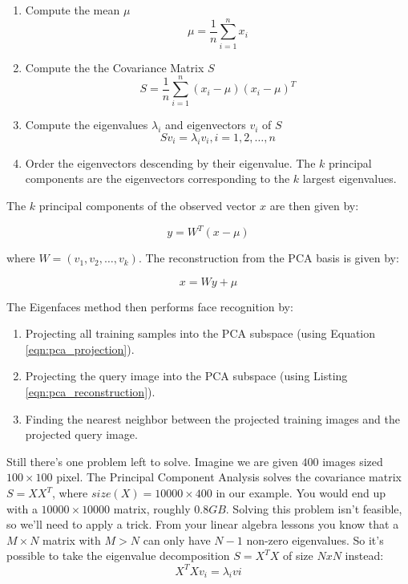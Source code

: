 \begin{enumerate}
	\item Compute the mean $\mu$
		\begin{equation} \label{eqn:pca_mean}
			\mu = \frac{1}{n} \sum_{i=1}^{n} x_{i}
		\end{equation}
	\item Compute the the Covariance Matrix $S$
		\begin{equation} \label{eqn:pca_cov}
			S = \frac{1}{n} \sum_{i=1}^{n} (x_{i} - \mu) (x_{i} - \mu)^{T}
		\end{equation}
	\item Compute the eigenvalues $\lambda_{i}$ and eigenvectors $v_{i}$ of $S$
		\begin{equation}  \label{eqn:pca_eigenvalues}
			S v_{i} = \lambda_{i} v_{i}, i=1,2,\ldots,n
		\end{equation}
	\item Order the eigenvectors descending by their eigenvalue. The $k$ principal components are the eigenvectors corresponding to the $k$ largest eigenvalues.
\end{enumerate}

The $k$ principal components of the observed vector $x$ are then given by:

\begin{equation} \label{eqn:pca_projection}
	y = W^{T} (x - \mu)
\end{equation}

where $W = (v_{1}, v_{2}, \ldots, v_{k})$. The reconstruction from the PCA basis is given by:

\begin{equation} \label{eqn:pca_reconstruction}
	x = W y + \mu
\end{equation}

The Eigenfaces method then performs face recognition by:

\begin{enumerate}
	\item Projecting all training samples into the PCA subspace (using Equation \ref{eqn:pca_projection}).
	\item Projecting the query image into the PCA subspace (using Listing \ref{eqn:pca_reconstruction}).
	\item Finding the nearest neighbor between the projected training images and the projected query image.
\end{enumerate}

Still there's one problem left to solve. Imagine we are given $400$ images sized $100 \times 100$ pixel. The Principal Component Analysis solves the covariance matrix $S = X X^{T}$, where ${size}(X) = 10000 \times 400$ in our example. You would end up with a $10000 \times 10000$ matrix, roughly $0.8 GB$. Solving this problem isn't feasible, so we'll need to apply a trick. From your linear algebra lessons you know that a $M \times N$ matrix with $M > N$ can only have $N - 1$ non-zero eigenvalues. So it's possible to take the eigenvalue decomposition $S = X^{T} X$ of size $N x N$ instead:
\begin{equation}
	X^{T} X v_{i} = \lambda_{i} v{i}
\end{equation}

